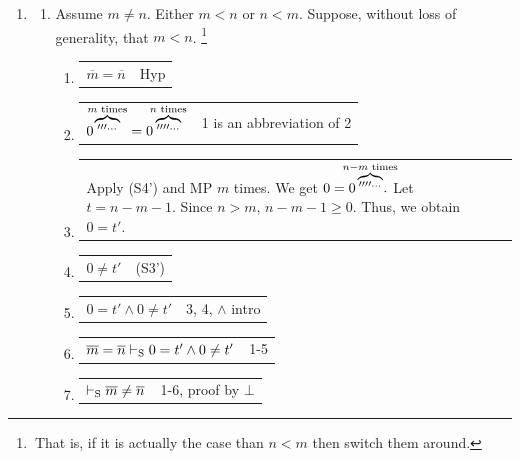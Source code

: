 \begin{enumerate} [label = \alph*.]
    \item \begin{enumerate} [label = \roman*.]
        \item Assume $m \not = n$. Either $m<n$ or $n < m$. Suppose, without loss of generality, that $m < n$. \footnote{$\ $That is, if it is actually the case than $n<m$ then switch them around.}
        \begin{enumerate} [label = \arabic*.]
            \item \begin{tabular}{p{8cm} r}
                $\overline{m} = \overline{n}$ & Hyp
                \end{tabular}
            \item \begin{tabular}{p{8cm} r}
                $0\hspace{-.6em}\overbrace{'''^{\dots}}^{m \text{ times}} = 0\hspace{-.4em}\overbrace{''''^{\dots}}^{n \text{ times}}$ & 1 is an abbreviation of 2
                \end{tabular}
            \item \begin{tabular}{p{8cm} r}
                Apply (S4') and MP $m$ times. We get $0=0\hspace{-1.1em}\overbrace{''''^{\dots}}^{n-m \text{ times}}\hspace{-1.2em}.$ Let $t=n-m-1$. Since $n>m$, $n- m-1\geq 0$. Thus, we obtain $0=t'$.
                \end{tabular}
            \item \begin{tabular}{p{8cm} r}
                $0 \not = t'$ & (S3')
                \end{tabular}
            \item \begin{tabular}{p{8cm} r}
                $0=t' \land 0 \not = t'$ & 3, 4, $\land$ intro
                \end{tabular}
            \item \begin{tabular}{p{8cm} r}
                $\overline{m}=\overline{n} \vdash_\text{S} 0=t' \land 0 \not = t'$ & 1-5
                \end{tabular}
            \item \begin{tabular}{p{8cm} r}
                $\vdash_\text{S} \overline{m} \not = \overline{n}$ & 1-6, proof by $\bot$

\end{tabular}
\end{enumerate}
\end{enumerate}
\end{enumerate}
